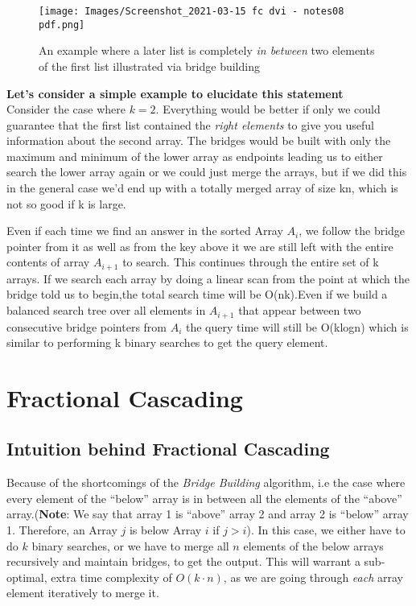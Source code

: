 \documentclass[11pt]{article}
\begin{document}
\begin{figure}[H]
    \centering
    \texttt{[image: Images/Screenshot\_2021-03-15 fc dvi - notes08 pdf.png]}
    \caption{An example where a later list is completely \textit{in between} two elements of the first list illustrated via bridge building}
    \label{fig:label}
\end{figure}


\textbf{Let's consider a simple example to elucidate this statement} \\
Consider the case where $k = 2$. Everything would be better if only we could guarantee that the first list contained the \textit{right elements} to give you useful information about the second array. The bridges would be built with only the maximum and minimum of the lower array as endpoints leading us to either search the lower array again or we could just merge the arrays, but if we did this in the general case we'd end up with a totally merged array of size kn, which is not so good if k is large.

Even if each time we find an answer in the sorted Array $A_i$, we follow the bridge pointer from it as well as from the key above it we are still left with the entire contents of array $A_{i+1}$ to search. This continues through the entire set of k arrays. If we search each array by doing a linear scan from the point at which the bridge told us to begin,the total search time will be O(nk).Even if we build a balanced search tree over all elements in $A_{i+1}$ that appear between two consecutive bridge pointers from $A_i$ the query time will still be O(klogn) which is similar to performing k binary searches to get the query element.



\section{Fractional Cascading}

\subsection{Intuition behind Fractional Cascading}
Because of the shortcomings of the \textit{Bridge Building} algorithm, i.e the case where every element of the ``below'' array is in between all the elements of the ``above'' array.(\textbf{Note}: We say that array 1 is “above” array 2 and array 2 is “below” array 1. Therefore, an Array $j$ is below Array $i$ if $j > i$). In this case, we either have to do $k$ binary searches, or we have to merge all $n$ elements of the below arrays recursively and maintain bridges, to get the output. This will warrant a sub-optimal, extra time complexity of $O(k \cdot n)$, as we are going through \textit{each} array element iteratively to merge it.
\end{document}
